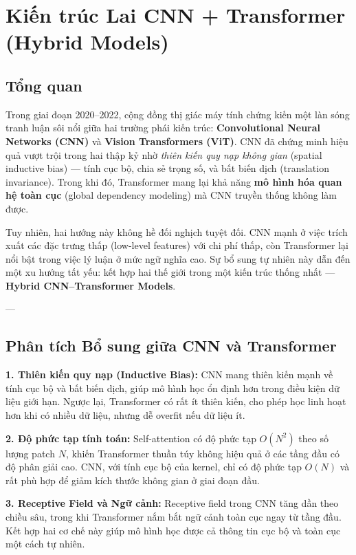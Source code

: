 \section{Kiến trúc Lai CNN + Transformer (Hybrid Models)}
\label{sec:hybrid_cnn_transformer}

\subsection{Tổng quan}
Trong giai đoạn 2020–2022, cộng đồng thị giác máy tính chứng kiến một làn sóng tranh luận sôi nổi giữa hai trường phái kiến trúc: \textbf{Convolutional Neural Networks (CNN)} và \textbf{Vision Transformers (ViT)}.  
CNN đã chứng minh hiệu quả vượt trội trong hai thập kỷ nhờ \textit{thiên kiến quy nạp không gian} (spatial inductive bias) — tính cục bộ, chia sẻ trọng số, và bất biến dịch (translation invariance). Trong khi đó, Transformer mang lại khả năng \textbf{mô hình hóa quan hệ toàn cục} (global dependency modeling) mà CNN truyền thống không làm được.

Tuy nhiên, hai hướng này không hề đối nghịch tuyệt đối. CNN mạnh ở việc trích xuất các đặc trưng thấp (low-level features) với chi phí thấp, còn Transformer lại nổi bật trong việc lý luận ở mức ngữ nghĩa cao.  
Sự bổ sung tự nhiên này dẫn đến một xu hướng tất yếu: kết hợp hai thế giới trong một kiến trúc thống nhất — \textbf{Hybrid CNN–Transformer Models}.

---

\subsection{Phân tích Bổ sung giữa CNN và Transformer}
\label{subsec:why_hybrid_models}

\textbf{1. Thiên kiến quy nạp (Inductive Bias):}  
CNN mang thiên kiến mạnh về tính cục bộ và bất biến dịch, giúp mô hình học ổn định hơn trong điều kiện dữ liệu giới hạn.  
Ngược lại, Transformer có rất ít thiên kiến, cho phép học linh hoạt hơn khi có nhiều dữ liệu, nhưng dễ overfit nếu dữ liệu ít.

\textbf{2. Độ phức tạp tính toán:}  
Self-attention có độ phức tạp $O(N^2)$ theo số lượng patch $N$, khiến Transformer thuần túy không hiệu quả ở các tầng đầu có độ phân giải cao.  
CNN, với tính cục bộ của kernel, chỉ có độ phức tạp $O(N)$ và rất phù hợp để giảm kích thước không gian ở giai đoạn đầu.

\textbf{3. Receptive Field và Ngữ cảnh:}  
Receptive field trong CNN tăng dần theo chiều sâu, trong khi Transformer nắm bắt ngữ cảnh toàn cục ngay từ tầng đầu.  
Kết hợp hai cơ chế này giúp mô hình học được cả thông tin cục bộ và toàn cục một cách tự nhiên.

